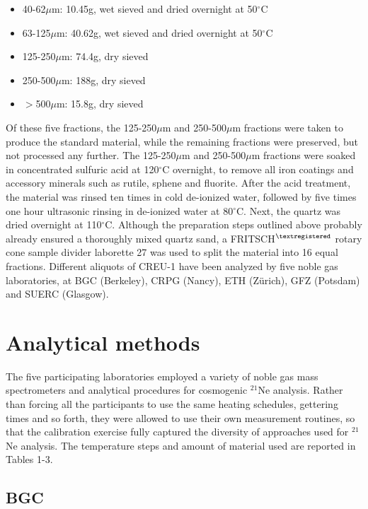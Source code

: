 \documentclass[authoryear,review,12pt]{elsarticle}
\begin{document}
\begin{itemize}
\item 40-62$\mu$m: 10.45g, wet sieved and dried overnight at 50$^{\circ}$C
\item 63-125$\mu$m: 40.62g, wet sieved and dried overnight at 50$^{\circ}$C
\item 125-250$\mu$m: 74.4g, dry sieved
\item 250-500$\mu$m: 188g, dry sieved
\item $>$500$\mu$m: 15.8g, dry sieved
\end{itemize}

Of these five fractions, the 125-250$\mu$m and 250-500$\mu$m fractions
were taken to produce the standard material, while the remaining
fractions were preserved, but not processed any further.  The
125-250$\mu$m and 250-500$\mu$m fractions were soaked in concentrated
sulfuric acid at 120$^{\circ}$C overnight, to remove all iron coatings
and accessory minerals such as rutile, sphene and fluorite. After the
acid treatment, the material was rinsed ten times in cold de-ionized
water, followed by five times one hour ultrasonic rinsing in
de-ionized water at 80$^{\circ}$C.  Next, the quartz was dried
overnight at 110$^{\circ}$C. Although the preparation steps outlined
above probably already ensured a thoroughly mixed quartz sand, a
FRITSCH$^{\tiny\textregistered}$ rotary cone sample divider laborette
27 was used to split the material into 16 equal fractions. Different
aliquots of CREU-1 have been analyzed by five noble gas laboratories,
at BGC (Berkeley), CRPG (Nancy), ETH (Z\"{u}rich), GFZ (Potsdam) and
SUERC (Glasgow).

\section{Analytical methods}
\label{sec:methods}

The five participating laboratories employed a variety of noble gas
mass spectrometers and analytical procedures for cosmogenic $^{21}$Ne
analysis. Rather than forcing all the participants to use the same
heating schedules, gettering times and so forth, they were allowed to
use their own measurement routines, so that the calibration exercise
fully captured the diversity of approaches used for $^{21}$Ne
analysis. The temperature steps and amount of material used are
reported in Tables 1-3.

\subsection{BGC}
\end{document}
